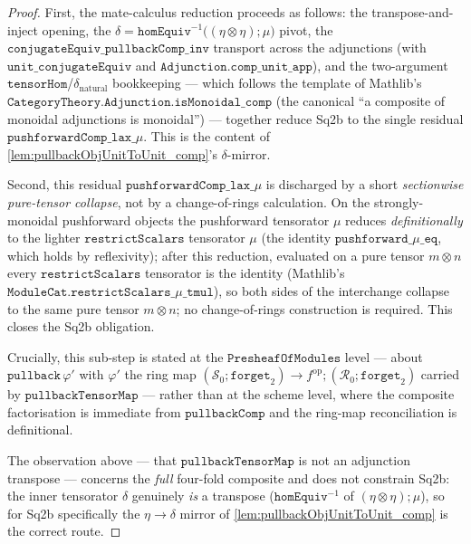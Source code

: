 \begin{proof}
  First, the mate-calculus reduction proceeds as follows: the transpose-and-inject
  opening, the \(\delta = \mathtt{homEquiv}^{-1}\bigl((\eta\otimes\eta)\mathbin{;}\mu\bigr)\)
  pivot, the \(\mathtt{conjugateEquiv\_pullbackComp\_inv}\) transport across the adjunctions
  (with \(\mathtt{unit\_conjugateEquiv}\) and \(\mathtt{Adjunction.comp\_unit\_app}\)), and
  the two-argument \(\mathtt{tensorHom}\)/\(\delta_{\mathrm{natural}}\) bookkeeping --- which
  follows the template of Mathlib's
  \(\mathtt{CategoryTheory.Adjunction.isMonoidal\_comp}\) (the canonical ``a composite of
  monoidal adjunctions is monoidal'') --- together reduce Sq2b to the single residual
  \(\mathtt{pushforwardComp\_lax\_}\mu\). This is the content of
  \cref{lem:pullbackObjUnitToUnit_comp}'s \(\delta\)-mirror.

  Second, this residual \(\mathtt{pushforwardComp\_lax\_}\mu\) is discharged by a short
  \emph{sectionwise pure-tensor collapse}, not by a change-of-rings calculation. On the
  strongly-monoidal pushforward objects the pushforward tensorator \(\mu\) reduces
  \emph{definitionally} to the lighter \(\mathtt{restrictScalars}\) tensorator \(\mu\) (the
  identity \(\mathtt{pushforward\_}\mu\mathtt{\_eq}\), which holds by reflexivity); after
  this reduction, evaluated on a pure tensor \(m \otimes n\) every
  \(\mathtt{restrictScalars}\) tensorator is the identity (Mathlib's
  \(\mathtt{ModuleCat.restrictScalars\_}\mu\mathtt{\_tmul}\)), so both sides of the
  interchange collapse to the same pure tensor \(m \otimes n\); no change-of-rings
  construction is required. This closes the Sq2b obligation.

  Crucially, this sub-step is stated at the \(\mathtt{PresheafOfModules}\) level --- about
  \(\mathtt{pullback}\,\varphi'\) with \(\varphi'\) the ring map
  \((\mathcal{S}_{0}\mathbin{;}\mathtt{forget}_{2}) \to f^{\mathrm{op}}\mathbin{;}
  (\mathcal{R}_{0}\mathbin{;}\mathtt{forget}_{2})\) carried by \(\mathtt{pullbackTensorMap}\)
  --- rather than at the scheme level, where the composite factorisation is immediate from
  \(\mathtt{pullbackComp}\) and the ring-map reconciliation is definitional.

  The observation above --- that \(\mathtt{pullbackTensorMap}\) is not an adjunction
  transpose --- concerns the \emph{full} four-fold composite and does not constrain
  Sq2b: the inner tensorator \(\delta\) genuinely \emph{is} a transpose
  (\(\mathtt{homEquiv}^{-1}\) of \((\eta\otimes\eta)\mathbin{;}\mu\)), so for Sq2b
  specifically the \(\eta\to\delta\) mirror of \cref{lem:pullbackObjUnitToUnit_comp} is the
  correct route.


\end{proof}
